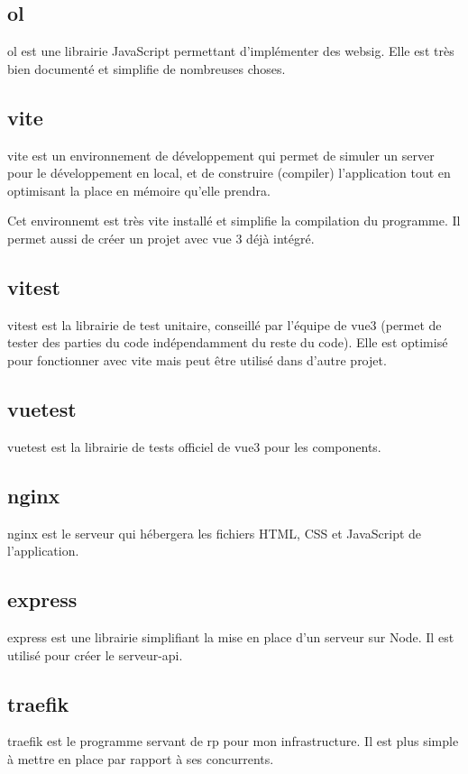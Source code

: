 \documentclass[
    iai, %
    il, %
]{heig-tb}
\begin{document}
\subsection{\gls{ol}}
\gls{ol} est une librairie JavaScript permettant d'implémenter des \gls{websig}.
Elle est très bien documenté et simplifie de nombreuses choses.

\subsection{\gls{vite}}
\gls{vite} est un environnement de développement qui permet de simuler un server pour le développement en local,
et de construire (compiler) l'application tout en optimisant la place en mémoire qu'elle prendra.

Cet environnemt est très vite installé et simplifie la compilation du programme.
Il permet aussi de créer un projet avec vue 3 déjà intégré.

\subsection{\gls{vitest}}
\gls{vitest} est la librairie de test unitaire, conseillé par l'équipe de \gls{vue3} (permet de tester des parties du code indépendamment du reste du code).
Elle est optimisé pour fonctionner avec \gls{vite} mais peut être utilisé dans d'autre projet.

\subsection{\gls{vuetest}}
\gls{vuetest} est la librairie de tests officiel de \gls{vue3} pour les components.

\subsection{\gls{nginx}}
\gls{nginx} est le serveur qui hébergera les fichiers HTML, CSS et JavaScript de l'application.

\subsection{\gls{express}}
\gls{express} est une librairie simplifiant la mise en place d'un serveur sur Node.
Il est utilisé pour créer le serveur-api.

\subsection{\gls{traefik}}
\gls{traefik} est le programme servant de \gls{rp} pour mon infrastructure.
Il est plus simple à mettre en place par rapport à ses concurrents.
\end{document}
